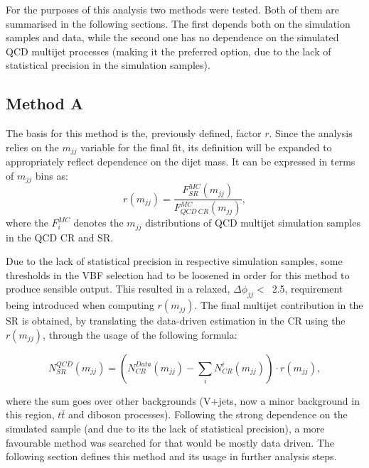 \hspace{10pt} For the purposes of this analysis two methods were tested. Both of them are summarised in the following sections. The first depends both on the simulation samples and data, while the second one has no dependence on the simulated QCD multijet processes (making it the preferred option, due to the lack of statistical precision in the simulation samples).

\subsection{Method A}
\label{sec:qcd_a}
\hspace{10pt} The basis for this method is the, previously defined, factor $r$. Since the analysis relies on the $m_{jj}$ variable for the final fit, its definition will be expanded to appropriately reflect dependence on the dijet mass. It can be expressed in terms of $m_{jj}$ bins as: 
\begin{equation}
    r(m_{jj}) = \frac{F_{SR}^{MC}(m_{jj})}{F_{QCD~CR}^{MC}(m_{jj})},
\end{equation}
where the $F^{MC}_i$ denotes the $m_{jj}$ distributions of QCD multijet simulation samples in the QCD CR and SR.

\hspace{10pt} Due to the lack of statistical precision in respective simulation samples, some thresholds in the VBF selection had to be loosened in order for this method to produce sensible output. This resulted in a relaxed, $\Delta\phi_{jj}<$~2.5, requirement being introduced when computing $r(m_{jj})$. The final multijet contribution in the SR is obtained, by translating the data-driven estimation in the CR using the $r(m_{jj})$, through the usage of the following formula:

\begin{equation}
    N_{SR}^{QCD}(m_{jj}) = \left( N_{CR}^{Data}(m_{jj}) - \sum_i N^i_{CR}(m_{jj})\right)\cdot r(m_{jj}),
\end{equation}

where the sum goes over other backgrounds (V+jets, now a minor background in this region, $t\bar{t}$ and diboson processes). Following the strong dependence on the simulated sample (and due to its the lack of statistical precision), a more favourable method was searched for that would be mostly data driven. The following section defines this method and its usage in further analysis steps.


